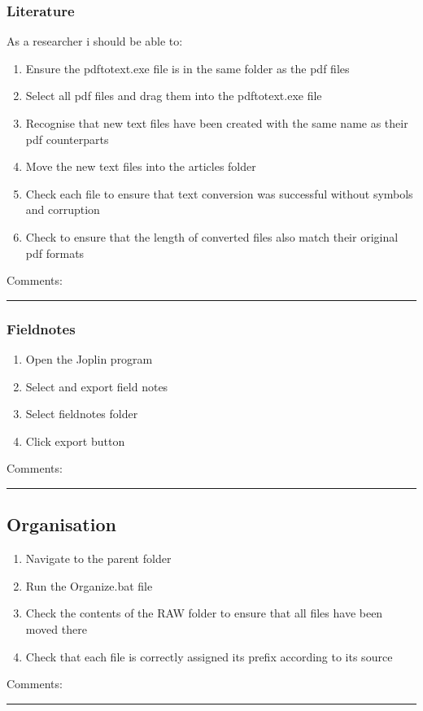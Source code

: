 \documentclass[11pt, a4paper,]{scrartcl}
\begin{document}
\subsubsection{Literature}
As a researcher i should be able to:
\begin{enumerate}
    \item Ensure the pdftotext.exe file is in the same folder as the pdf files
    \item Select all pdf files and drag them into the pdftotext.exe file
    \item Recognise that new text files have been created with the same name as their pdf counterparts
    \item Move the new text files into the articles folder
    \item Check each file to ensure that text conversion was successful without symbols and corruption
    \item Check to ensure that the length of converted files also match their original pdf formats
\end{enumerate}
Comments:
\vspace{2cm}
\hrule
\subsubsection{Fieldnotes}
\begin{enumerate}
    \item Open the Joplin program
    \item Select and export field notes
    \item Select fieldnotes folder
    \item Click export button
\end{enumerate}
Comments:
\vspace{2cm}
\hrule
\subsection{Organisation}
\begin{enumerate}
    \item Navigate to the parent folder
    \item Run the Organize.bat file
    \item Check the contents of the RAW folder to ensure that all files have been moved there
    \item Check that each file is correctly assigned its prefix according to its source
\end{enumerate}
Comments:
\vspace{2cm}
\hrule
\end{document}
